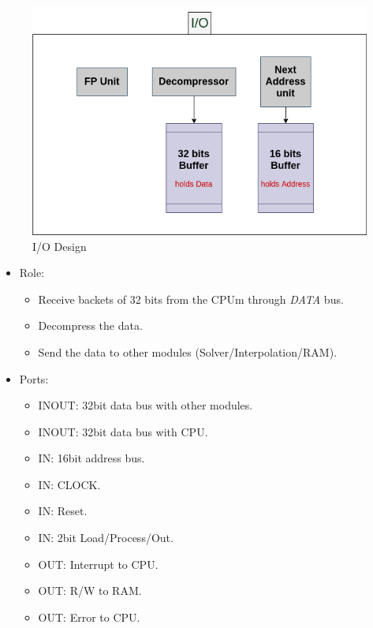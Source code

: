 \documentclass[12pt]{report}
\begin{document}
\begin{figure}[hp]
    \centering
    \includegraphics[width=\textwidth]{IO}
    \caption{I/O Design}
    \label{fig:io}
\end{figure}

\begin{itemize}
    \item Role:
    \begin{itemize}
        \item Receive backets of 32 bits from the CPUm through \emph{DATA} bus.
        \item Decompress the data.
        \item Send the data to other modules (Solver/Interpolation/RAM).
    \end{itemize}
    \item Ports:
    \begin{itemize}
        \item INOUT: 32bit data bus with other modules.
        \item INOUT: 32bit data bus with CPU.
        \item IN: 16bit address bus.
        \item IN: CLOCK.
        \item IN: Reset.
        \item IN: 2bit Load/Process/Out.
        \item OUT: Interrupt to CPU.
        \item OUT: R/W to RAM.
        \item OUT: Error to CPU.
    \end{itemize}
\end{itemize}
\end{document}
